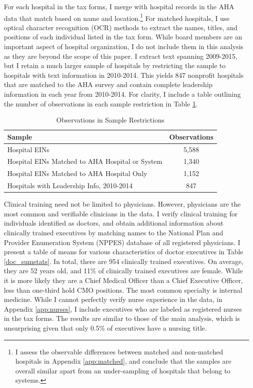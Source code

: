 \documentclass[12pt]{article}
\begin{document}
    For each hospital in the tax forms, I merge with hospital records in the AHA data that match based on name and location.\footnote{I assess the observable differences between matched and non-matched hospitals in Appendix \ref{app:matched}, and conclude that the samples are overall similar apart from an under-sampling of hospitals that belong to systems.} For matched hospitals, I use optical character recognition (OCR) methods to extract the names, titles, and positions of each individual listed in the tax form. While board members are an important aspect of hospital organization, I do not include them in this analysis as they are beyond the scope of this paper. I extract text spanning 2009-2015, but I retain a much larger sample of hospitals by restricting the sample to hospitals with text information in 2010-2014. This yields 847 nonprofit hospitals that are matched to the AHA survey and contain complete leadership information in each year from 2010-2014. For clarity, I include a table outlining the number of observations in each sample restriction in Table \ref{tab:sample}.

    \begin{table}[ht!]
    \centering
    \caption{\label{tab:sample}Observations in Sample Restrictions}
    \centering
    \begin{tabular}[t]{lc}
    \toprule
    Sample & Observations\\
    \toprule
    Hospital EINs & 5,588\\
    \addlinespace
    Hospital EINs Matched to AHA Hospital or System \hspace{2mm} & 1,340\\
    \addlinespace
    Hospital EINs Matched to AHA Hospital Only & 1,152\\
    \addlinespace
    Hospitals with Leadership Info, 2010-2014 & 847\\
    \bottomrule
    \end{tabular}
    \end{table}



    Clinical training need not be limited to physicians. However, physicians are the most common and verifiable clinicians in the data. I verify clinical training for individuals identified as doctors, and obtain additional information about clinically trained executives by matching names to the National Plan and Provider Enumeration System (NPPES) database of all registered physicians. I present a table of means for various characteristics of doctor executives in Table \ref{doc_sumstats}. In total, there are 954 clinically trained executives. On average, they are 52 years old, and 11\% of clinically trained executives are female. While it is more likely they are a Chief Medical Officer than a Chief Executive Officer, less than one-third hold CMO positions. The most common specialty is internal medicine. While I cannot perfectly verify nurse experience in the data, in Appendix \ref{app:nurses}, I include executives who are labeled as registered nurses in the tax forms. The results are similar to those of the main analysis, which is unsurprising given that only 0.5\% of executives have a nursing title. 
\end{document}
